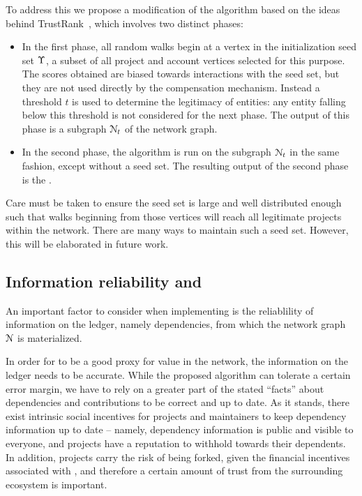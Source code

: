 To address this we propose a modification of the \pagerank{} algorithm based
on the ideas behind TrustRank~\cite{trustrank}, which involves two distinct
phases:

\begin{itemize}
\item In the first phase, all random walks begin at a vertex in the
  initialization seed set $\Upsilon$, a subset of all project and account
  vertices selected for this purpose.
  The scores obtained are biased towards interactions with the seed set, but
  they are not used directly by the compensation mechanism. Instead a threshold
  $t$ is used to determine the legitimacy of entities: any entity falling below
  this threshold is not considered for the next phase. The output of this phase
  is a subgraph $\mathcal{N}_t$ of the network graph.
\item In the second phase, the algorithm is run on the subgraph $\mathcal{N}_t$
  in the same fashion, except without a seed set. The resulting output of the
  second phase is the \osrank{}.
\end{itemize}
Care must be taken to ensure the seed set is large and well distributed enough
such that walks beginning from those vertices will reach all legitimate
projects within the network. There are many ways to maintain such a seed set.
However, this will be elaborated in future work.

\subsection{Information reliability and \osrank{}}

An important factor to consider when implementing \osrank{} is the reliablility
of information on the ledger, namely dependencies, from which the
network graph $\mathcal{N}$ is materialized.

In order for \osrank{} to be a good proxy for value in the network, the
information on the ledger needs to be accurate. While the proposed algorithm
can tolerate a certain error margin, we have to rely on a greater part of the
stated ``facts'' about dependencies and contributions to be correct and up to
date. As it stands, there exist intrinsic social incentives for
projects and maintainers to keep dependency information up to date -- namely,
dependency information is public and visible to everyone, and projects have a
reputation to withhold towards their dependents. In addition, projects carry
the risk of being forked, given the financial incentives associated with
\osrank{}, and therefore a certain amount of trust from the surrounding
ecosystem is important.

